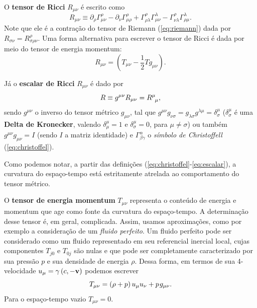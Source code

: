 \documentclass[12pt,a4paper,titlepage,brazil]{article}
\begin{document}
O {\bf tensor de Ricci} $R_{\mu \nu}$ é escrito como
\begin{equation}
 \label{eq:ricci}
 R_{\mu \nu} \equiv \partial_{\rho }\Gamma^{\rho}_{\mu \nu} - \partial_{\nu} \Gamma^{\rho}_{\mu \rho} 
 + \Gamma^{\rho}_{\rho \lambda} \Gamma^{\lambda}_{\mu \nu} - \Gamma^{\rho}_{\nu \lambda} \Gamma^{\lambda}_{\rho \mu} .
\end{equation}
Note que ele é a contração do tensor de Riemann (\ref{eq:riemann}) dada por $R_{\sigma \nu} = R^{\rho}_{\sigma \rho \nu}$. Uma forma alternativa para escrever o tensor de Ricci é dada por meio do tensor de energia momentum:
\begin{equation}
 R_{\mu \nu} = \left(T_{\mu \nu} - \frac{1}{2} T g_{\mu \nu}\right) . \label{eq:RT}
\end{equation}

Já o {\bf escalar de Ricci} $R_{\mu \nu}$ é dado por
\begin{equation}
 R \equiv g^{\mu \nu} R_{\mu \nu} = R^{\mu}_{\hspace{0.15cm}\mu} , \label{eq:escalar}
\end{equation}
sendo $g^{\mu \nu}$ o inverso do tensor métrico $g_{\mu \nu}$, tal que $g^{\mu \nu} g_{\nu \sigma} = g_{\lambda \sigma} g^{\lambda \mu} = \delta^{\mu}_{\sigma}$ ($\delta^{\mu}_{\sigma}$ é uma {\bf Delta de Kronecker}, valendo $\delta^{\mu}_{\mu} = 1$ e $\delta^{\mu}_{\sigma} = 0$, para $\mu \neq \sigma$) ou também $g^{\mu \nu} g_{\mu \nu} = I$ (sendo $I$ a matriz identidade) e $\Gamma^{\alpha}_{\beta \gamma}$ o \textit{símbolo de Christoffell} (\ref{eq:christoffel}).

Como podemos notar, a partir das definições (\ref{eq:christoffel}-\ref{eq:escalar}), a curvatura do espaço-tempo está estritamente atrelada ao comportamento do tensor métrico.

O {\bf tensor de energia momentum} $T_{\mu \nu}$ representa o conteúdo de energia e momentum que age como fonte da curvatura do espaço-tempo. A determinação desse tensor é, em geral, complicada. Assim, usamos aproximações, como por exemplo a consideração de um \emph{fluido perfeito}. Um fluido perfeito pode ser considerado como um fluido representado em seu referencial inercial local, cujas componentes $T_{j 0}$ e $T_{0 j}$ são nulas e que pode ser completamente caracterizado por sua pressão $p$ e sua densidade de energia $\rho$. Dessa forma, em termos de sua 4-velocidade $u_{\mu} = \gamma \left(c, - {\bf v}\right)$ podemos escrever
\begin{equation}
 T_{\mu \nu} = \left(\rho + p\right) u_{\mu} u_{\nu} + p\hspace{0.03cm}g_{\mu \nu} . \label{eq:energiamomento}
\end{equation}
Para o espaço-tempo vazio $T_{\mu \nu} = 0$.\\ 
\end{document}
